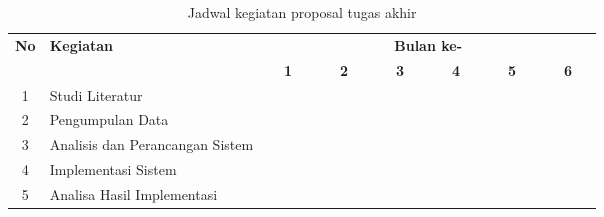 \begin{table}[h!]
  \centering
    \caption{Jadwal kegiatan proposal tugas akhir}
  \label{Novella}
  \begin{tabular}{|c|m{2.5cm}|m{0.01cm}|m{0.01cm}|m{0.01cm}|m{0.01cm}|m{0.01cm}|m{0.01cm}|m{0.01cm}|m{0.01cm}|m{0.01cm}|m{0.01cm}|m{0.01cm}|m{0.01cm}|m{0.01cm}|m{0.01cm}|m{0.01cm}|m{0.01cm}|m{0.01cm}|m{0.01cm}|m{0.01cm}|m{0.01cm}|m{0.01cm}|m{0.01cm}|m{0.01cm}|m{0.01cm}|}
    \hline
    \multirow{2}{*}{\textbf{No}} & \multirow{2}{*}{\textbf{Kegiatan}} & \multicolumn{24}{|c|}{\textbf{Bulan ke-}} \\
    \hhline{~~------------------------}
    {} & {} & \multicolumn{4}{|c|}{\textbf{1}} & \multicolumn{4}{|c|}{\textbf{2}} & \multicolumn{4}{|c|}{\textbf{3}} & \multicolumn{4}{|c|}{\textbf{4}} & \multicolumn{4}{|c|}{\textbf{5}} & \multicolumn{4}{|c|}{\textbf{6}}\\
    \hline
    1 & Studi Literatur & \cellcolor{blue!25} & \cellcolor{blue!25} & \cellcolor{blue!25} & \cellcolor{blue!25}& \cellcolor{blue!25} & \cellcolor{blue!25} & \cellcolor{blue!25} & \cellcolor{blue!25}& \cellcolor{blue!25} & \cellcolor{blue!25} & \cellcolor{blue!25} & \cellcolor{blue!25}& \cellcolor{blue!25} & \cellcolor{blue!25} & \cellcolor{blue!25} & \cellcolor{blue!25}& \cellcolor{blue!25} & \cellcolor{blue!25} & \cellcolor{blue!25} & \cellcolor{blue!25}& \cellcolor{blue!25} & \cellcolor{blue!25} & \cellcolor{blue!25} & \cellcolor{blue!25}\\
    \hline
    2 & Pengumpulan Data & \cellcolor{blue!25} & \cellcolor{blue!25} & \cellcolor{blue!25} & \cellcolor{blue!25} & {} & {} & {} & {} & {} & {} & {} & {}& {} & {} & {} & {}& {} & {} & {} & {}& {} & {} & {} & {}\\
    \hline
    3 & Analisis dan Perancangan Sistem &  {} & {} & {} & {}  & \cellcolor{blue!25} & \cellcolor{blue!25} & \cellcolor{blue!25} & \cellcolor{blue!25} & \cellcolor{blue!25} & \cellcolor{blue!25} & \cellcolor{blue!25} & \cellcolor{blue!25} & {} & {} & {} & {}& {} & {} & {} & {}& {} & {} & {} & {}\\
    \hline
    4 & Implementasi Sistem &  {} & {} & {} & {} & {} & {} & {} & {}& \cellcolor{blue!25} & \cellcolor{blue!25} & \cellcolor{blue!25} & \cellcolor{blue!25} & \cellcolor{blue!25} & \cellcolor{blue!25} & \cellcolor{blue!25} & \cellcolor{blue!25} & {} & {} & {} & {}& {} & {} & {} & {}\\
    \hline
    5 & Analisa Hasil Implementasi &  {} & {} & {} & {} & {} & {} & {} & {}& {} & {} & {} & {} & \cellcolor{blue!25} & \cellcolor{blue!25} & \cellcolor{blue!25} & \cellcolor{blue!25} & \cellcolor{blue!25} & \cellcolor{blue!25} & \cellcolor{blue!25} & \cellcolor{blue!25} & {} & {} & {} & {}\\

\end{tabular}
\end{table}
